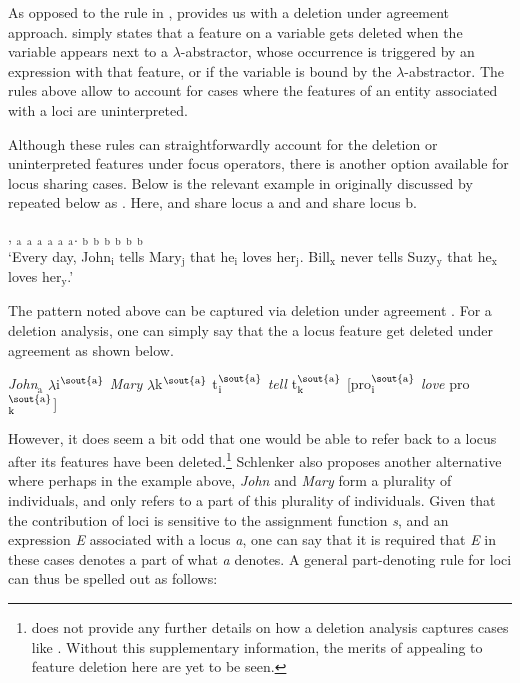 \documentclass[output=paper,
modfonts
]{langscibook}
\begin{document}
As opposed to the rule in ,  provides us with a deletion under agreement approach.  simply states that a feature on a variable gets deleted when the variable appears next to a \(\lambda\)-abstractor, whose occurrence is triggered by an expression with that feature, or if the variable is bound by the \(\lambda\)-abstractor. The rules above allow to account for cases where the features of an entity associated with a loci are uninterpreted. 

Although these rules can straightforwardly account for the deletion or uninterpreted features under focus operators, there is another option available for locus sharing cases. Below is the relevant example in  originally discussed by \citet{Kuhn2015} repeated below as . Here,  and  share locus a and  and  share locus b. 

\begin{exe} 
	\ex \label{ex:irani:76} , $_\text{a}$ $_\text{a}$  $_\text{a}$ $_\text{a}$ $_\text{a}$  $_\text{a}$. $_\text{b}$ $_\text{b}$  $_\text{b}$ $_\text{b}$ $_\text{b}$  $_\text{b}$ \\
	`Every day, John$_\text{i}$ tells Mary$_\text{j}$ that he$_\text{i}$ loves her$_\text{j}$. Bill$_\text{x}$ never tells Suzy$_\text{y}$ that he$_\text{x}$ loves her$_\text{y}$.' \citep[1073]{Schlenker2014}
\end{exe} 

The pattern noted above can be captured via deletion under agreement . For a deletion analysis, one can simply say that the a locus feature get deleted under agreement as shown below. 

\begin{exe}
	\ex \textit{John}$_\text{a}$ $\lambda$i$^{\text{\sout{a}}}$ \textit{Mary} $\lambda$k$^{\text{\sout{a}}}$ t$_\text{i}^{\text{\sout{a}}}$ \textit{tell} t$_\text{k}^{\text{\sout{a}}}$ [pro$_{\text{i}}^{\text{\sout{a}}}$ \textit{love} pro$_{\text{k}}^{\text{\sout{a}}}$] \citep[1079]{Schlenker2014}
\end{exe}

However, it does seem a bit odd that one would be able to refer back to a locus after its features have been deleted.\footnote{\citet{Schlenker2014} does not provide any further details on how a deletion analysis captures cases like . Without this supplementary information, the merits of appealing to feature deletion here are yet to be seen.} Schlenker also proposes another alternative where perhaps in the example above, \textit{John} and \textit{Mary} form a plurality of individuals, and  only refers to a part of this plurality of individuals. Given that the contribution of loci is sensitive to the assignment function \textit{s}, and an expression \textit{E} associated with a locus \textit{a}, one can say that it is required that \textit{E} in these cases denotes a part of what \textit{a} denotes. A general part-denoting rule for loci can thus be spelled out as follows:  
\end{document}

